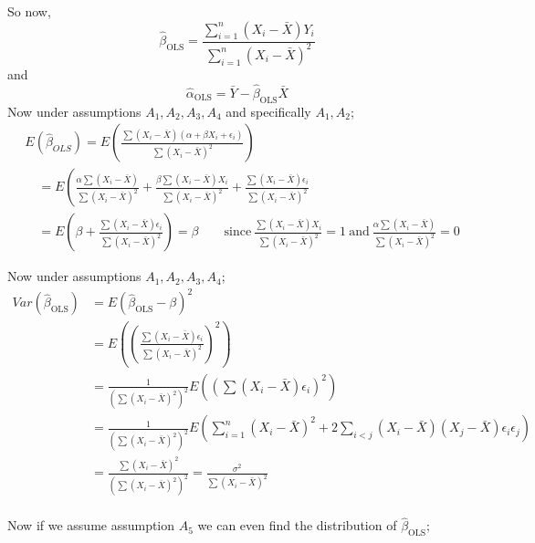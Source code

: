 \documentclass[12pt,a4paper]{article}
\begin{document}
So now,
\begin{equation*}
    \hat{\beta}_{\text{OLS}}=\frac{\sum_{i=1}^{n}(X_{i}-\bar{X})Y_{i}}{\sum_{i=1}^{n}(X_{i}-\bar{X})^2}
\end{equation*}
and
\begin{equation*}
    \hat{\alpha}_{\text{OLS}}= \bar{Y}- \hat{\beta}_{\text{OLS}}\bar{X}
\end{equation*}     
Now under assumptions \(A_{1},A_{2},A_{3},A_{4}\) and specifically \(A_{1},A_{2}\);  
\begin{align*} 
    & E\left(\hat{\beta}_{OLS}\right)=E\left(\frac{\sum\left(X_i-\bar{X}\right)\left(\alpha+\beta X_i+\epsilon_i\right)}{\sum\left(X_i-\bar{X}\right)^2}\right) \\ 
    & \quad=E\left(\frac{\alpha \sum\left(X_i-\bar{X}\right)}{\sum\left(X_i-\bar{X}\right)^2}+\frac{\beta \sum\left(X_i-\bar{X}\right) X_i}{\sum\left(X_i-\bar{X}\right)^2}+\frac{\sum\left(X_i-\bar{X}\right) \epsilon_i}{\sum\left(X_i-\bar{X}\right)^2}\right. \\ 
    & \quad=E\left(\beta+\frac{\sum\left(X_i-\bar{X}\right) \epsilon_i}{\sum\left(X_i-\bar{X}\right)^2}\right)=\beta \qquad \text{since} \ \frac{\sum (X_{i}-\bar{X})X_{i}}{\sum (X_{i}-\bar{X})^2}=1 \ \text{and} \ \frac{\alpha\sum (X_{i}-\bar{X})}{\sum (X_{i}-\bar{X})^2}=0
\end{align*}
\pagebreak

Now under assumptions \(A_1,A_2,A_3,A_4\);
\begin{align*}
    Var(\hat{\beta}_{\text{OLS}})&= E(\hat{\beta}_{\text{OLS}}-\beta)^2\\
    &= E\left( \left(\frac{\sum (X_{i}-\bar{X})\epsilon_{i}}{\sum(X_{i}-\bar{X})^2} \right)^2 \right)\\
    &=\frac{1}{\left( \sum (X_{i}-\bar{X})^2 \right)^2 }E\left( \left( \sum (X_{i} -\bar{X})\epsilon_{i} \right)^2  \right) \\
    &=\frac{1}{\left( \sum (X_{i}-\bar{X})^2 \right)^2 } E\left( \sum_{i=1}^n (X_{i}-\bar{X})^2 +2\sum_{i<j}(X_{i}-\bar{X})(X_{j}- \bar{X} )\epsilon_{i}\epsilon_{j}  \right) \\
    &= \frac{\sum (X_{i}-\bar{X})^2}{\left( \sum \left( X_{i}-\bar{X} \right)^2  \right)^2 }= \frac{\sigma^2}{\sum (X_{i}-\bar{X})^2}\\
\end{align*}

Now if we assume assumption \(A_5\) we can even find the distribution of \(\hat{\beta}_{\text{OLS}}\);
\end{document}
